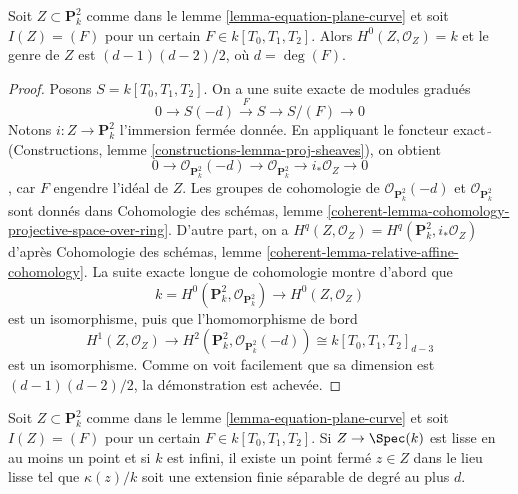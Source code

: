 \begin{lemma}
\label{lemma-genus-plane-curve}
Soit $Z \subset \mathbf{P}^2_k$ comme dans le lemme \ref{lemma-equation-plane-curve} et soit $I(Z) = (F)$ pour un certain $F \in k[T_0, T_1, T_2]$. Alors $H^0(Z, \mathcal{O}_Z) = k$ et le genre de $Z$ est $(d - 1)(d - 2)/2$, où $d = \deg(F)$.
\end{lemma}

\begin{proof}
Posons $S = k[T_0, T_1, T_2]$. On a une suite exacte de modules gradués $$
0 \to S(-d) \xrightarrow{F} S \to S/(F) \to 0
$$ Notons $i : Z \to \mathbf{P}^2_k$ l'immersion fermée donnée. En appliquant le foncteur exact $\widetilde{\ }$ (Constructions, lemme \ref{constructions-lemma-proj-sheaves}), on obtient $$
0 \to \mathcal{O}_{\mathbf{P}^2_k}(-d) \to
\mathcal{O}_{\mathbf{P}^2_k} \to i_*\mathcal{O}_Z \to 0
$$, car $F$ engendre l'idéal de $Z$. Les groupes de cohomologie de $\mathcal{O}_{\mathbf{P}^2_k}(-d)$ et $\mathcal{O}_{\mathbf{P}^2_k}$ sont donnés dans Cohomologie des schémas, lemme \ref{coherent-lemma-cohomology-projective-space-over-ring}. D'autre part, on a $H^q(Z, \mathcal{O}_Z) = H^q(\mathbf{P}^2_k, i_*\mathcal{O}_Z)$ d'après Cohomologie des schémas, lemme \ref{coherent-lemma-relative-affine-cohomology}. La suite exacte longue de cohomologie montre d'abord que $$
k = H^0(\mathbf{P}^2_k, \mathcal{O}_{\mathbf{P}^2_k}) \longrightarrow
H^0(Z, \mathcal{O}_Z)
$$ est un isomorphisme, puis que l'homomorphisme de bord $$
H^1(Z, \mathcal{O}_Z) \longrightarrow
H^2(\mathbf{P}^2_k, \mathcal{O}_{\mathbf{P}^2_k}(-d)) \cong
k[T_0, T_1, T_2]_{d - 3}
$$ est un isomorphisme. Comme on voit facilement que sa dimension est $(d - 1)(d - 2)/2$, la démonstration est achevée.
\end{proof}

\begin{lemma}
\label{lemma-smooth-plane-curve-point-over-separable}
Soit $Z \subset \mathbf{P}^2_k$ comme dans le lemme \ref{lemma-equation-plane-curve} et soit $I(Z) = (F)$ pour un certain $F \in k[T_0, T_1, T_2]$. Si $Z \to \Spec(k)$ est lisse en au moins un point et si $k$ est infini, il existe un point fermé $z \in Z$ dans le lieu lisse tel que $\kappa(z)/k$ soit une extension finie séparable de degré au plus $d$.
\end{lemma}

